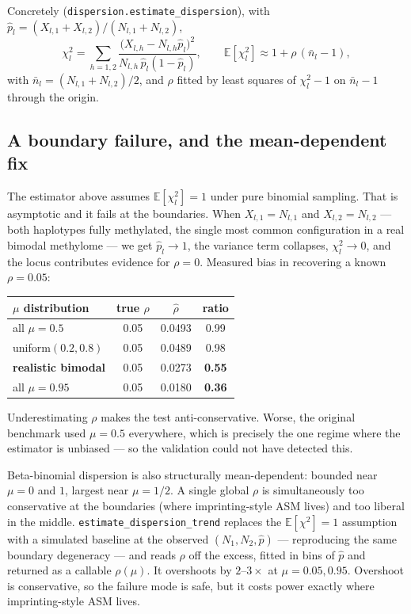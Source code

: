\documentclass[11pt]{article}
\begin{document}
Concretely (\texttt{dispersion.estimate\_dispersion}), with
$\hat p_l = (X_{l,1}+X_{l,2})/(N_{l,1}+N_{l,2})$,
\begin{equation}
\chi^2_l = \sum_{h=1,2}\frac{\bigl(X_{l,h} - N_{l,h}\hat p_l\bigr)^2}
{N_{l,h}\,\hat p_l (1-\hat p_l)},
\qquad
\mathbb{E}[\chi^2_l] \approx 1 + \rho\,(\bar n_l - 1),
\end{equation}
with $\bar n_l = (N_{l,1}+N_{l,2})/2$, and $\rho$ fitted by least squares of
$\chi^2_l - 1$ on $\bar n_l - 1$ through the origin.

\subsection{A boundary failure, and the mean-dependent fix}
\label{sec:rhomu}

The estimator above assumes $\mathbb{E}[\chi^2_l] = 1$ under pure binomial
sampling. That is asymptotic and it fails at the boundaries. When
$X_{l,1}=N_{l,1}$ and $X_{l,2}=N_{l,2}$ --- both haplotypes fully methylated,
the single most common configuration in a real bimodal methylome --- we get
$\hat p_l \to 1$, the variance term collapses, $\chi^2_l \to 0$, and the locus
contributes evidence for $\rho = 0$. Measured bias in recovering a known
$\rho = 0.05$:

\begin{center}
\small
\begin{tabular}{lccc}
\toprule
$\mu$ distribution & true $\rho$ & $\hat\rho$ & ratio \\
\midrule
all $\mu = 0.5$ & 0.05 & 0.0493 & 0.99 \\
uniform$(0.2, 0.8)$ & 0.05 & 0.0489 & 0.98 \\
\textbf{realistic bimodal} & 0.05 & 0.0273 & \textbf{0.55} \\
all $\mu = 0.95$ & 0.05 & 0.0180 & \textbf{0.36} \\
\bottomrule
\end{tabular}
\end{center}

Underestimating $\rho$ makes the test anti-conservative. Worse, the original
benchmark used $\mu = 0.5$ everywhere, which is precisely the one regime where
the estimator is unbiased --- so the validation could not have detected this.

Beta-binomial dispersion is also structurally mean-dependent: bounded near
$\mu = 0$ and $1$, largest near $\mu = 1/2$. A single global $\rho$ is
simultaneously too conservative at the boundaries (where imprinting-style ASM
lives) and too liberal in the middle. \texttt{estimate\_dispersion\_trend}
replaces the $\mathbb{E}[\chi^2]=1$ assumption with a simulated baseline at the
observed $(N_1, N_2, \hat p)$ --- reproducing the same boundary degeneracy ---
and reads $\rho$ off the excess, fitted in bins of $\hat p$ and returned as a
callable $\rho(\mu)$. It overshoots by $2$--$3\times$ at $\mu = 0.05, 0.95$.
Overshoot is conservative, so the failure mode is safe, but it costs power
exactly where imprinting-style ASM lives.
\end{document}

